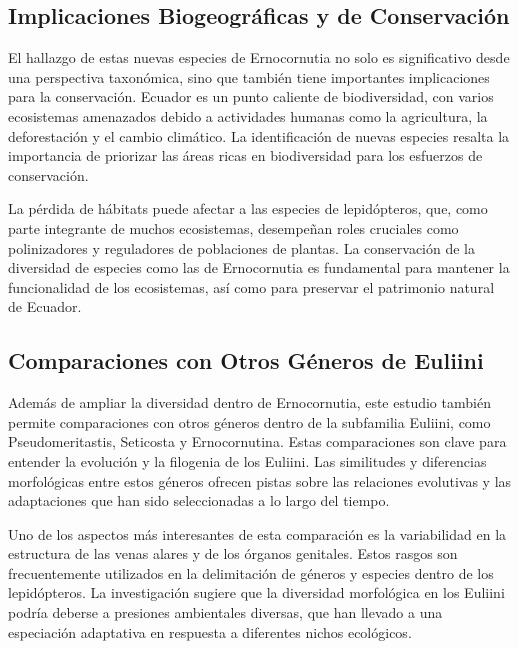 \documentclass[
  letterpaper,
  DIV=11,
  numbers=noendperiod,
  oneside]{scrreprt}
\begin{document}
\subsection{Implicaciones Biogeográficas y de
Conservación}\label{implicaciones-biogeogruxe1ficas-y-de-conservaciuxf3n}

El hallazgo de estas nuevas especies de Ernocornutia no solo es
significativo desde una perspectiva taxonómica, sino que también tiene
importantes implicaciones para la conservación. Ecuador es un punto
caliente de biodiversidad, con varios ecosistemas amenazados debido a
actividades humanas como la agricultura, la deforestación y el cambio
climático. La identificación de nuevas especies resalta la importancia
de priorizar las áreas ricas en biodiversidad para los esfuerzos de
conservación.

La pérdida de hábitats puede afectar a las especies de lepidópteros,
que, como parte integrante de muchos ecosistemas, desempeñan roles
cruciales como polinizadores y reguladores de poblaciones de plantas. La
conservación de la diversidad de especies como las de Ernocornutia es
fundamental para mantener la funcionalidad de los ecosistemas, así como
para preservar el patrimonio natural de Ecuador.

\subsection{Comparaciones con Otros Géneros de
Euliini}\label{comparaciones-con-otros-guxe9neros-de-euliini}

Además de ampliar la diversidad dentro de Ernocornutia, este estudio
también permite comparaciones con otros géneros dentro de la subfamilia
Euliini, como Pseudomeritastis, Seticosta y Ernocornutina. Estas
comparaciones son clave para entender la evolución y la filogenia de los
Euliini. Las similitudes y diferencias morfológicas entre estos géneros
ofrecen pistas sobre las relaciones evolutivas y las adaptaciones que
han sido seleccionadas a lo largo del tiempo.

Uno de los aspectos más interesantes de esta comparación es la
variabilidad en la estructura de las venas alares y de los órganos
genitales. Estos rasgos son frecuentemente utilizados en la delimitación
de géneros y especies dentro de los lepidópteros. La investigación
sugiere que la diversidad morfológica en los Euliini podría deberse a
presiones ambientales diversas, que han llevado a una especiación
adaptativa en respuesta a diferentes nichos ecológicos.
\end{document}
